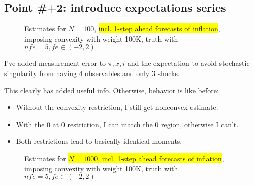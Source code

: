 \documentclass[11pt]{article}
\def \myFigPath {../../figures/}
\renewcommand{\[}{\begin{equation}}
\renewcommand{\]}{\end{equation}}
\def\myBiggerFigScale{0.4}
\def\myTinyFigScale{0.16}
\begin{document}
\newpage
\subsection*{Point \#+2: introduce expectations series}
\begin{figure}[h!]
{}
\caption{Estimates for $N=100$, \colorbox{yellow}{incl. 1-step ahead forecasts of inflation}, imposing convexity with weight 100K, truth with $nfe=5, fe \in(-2,2)$}
\end{figure}

I've added measurement error to $\pi,x,i$ and the expectation to avoid stochastic singularity from having 4 observables and only 3 shocks. 

This clearly has added useful info. Otherwise, behavior is like before:
\begin{itemize}
\item Without the convexity restriction, I still get nonconvex estimate.
\item With the 0 at 0 restriction, I can match the 0 region, otherwise I can't.
\item Both restrictions lead to basically identical moments.
\end{itemize}

\begin{figure}[h!]
{}
\caption{Estimates for \colorbox{yellow}{$N=1000$,  incl. 1-step ahead forecasts of inflation}, imposing convexity with weight 100K, truth with $nfe=5, fe \in(-2,2)$}
\end{figure}
\end{document}
